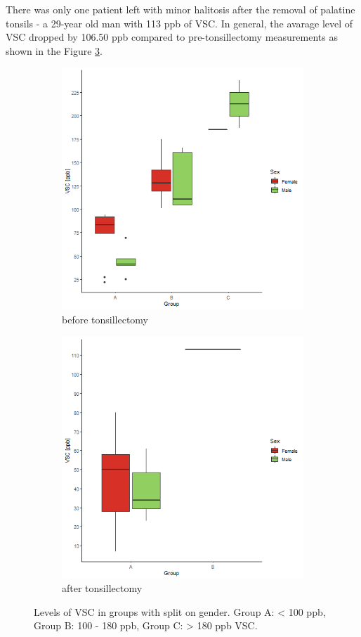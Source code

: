 \documentclass[12pt,a4paper,notitlepage]{report}
\begin{document}
There was only one patient left with minor halitosis after the removal of palatine tonsils - a 29-year old man with 113 ppb of VSC.
In general, the avarage level of VSC dropped by 106.50 ppb compared to pre-tonsillectomy measurements as shown in the Figure \ref{fig:Fig_3.1}.


\begin{figure}[hbt!]
	\centering
	\begin{subfigure}[b]{0.85\textwidth}
		\centering
		\includegraphics[width=.9\textwidth, height=.75\textwidth]{./Figures/Fig_3.1a2} 
		\caption{before tonsillectomy}
		\label{fig:Fig_3.1a}
	\end{subfigure} 
	\vspace*{2cm}
	
	\begin{subfigure}[b]{0.85\textwidth}
		\centering
		\includegraphics[width=.9\textwidth, height=.75\textwidth]{./Figures/Fig_3.1b2}
		\caption{after tonsillectomy}
		\label{fig:Fig_3.1b}
	\end{subfigure}
	 
	\caption{Levels of VSC in groups with split on gender. Group A: < 100 ppb, Group B: 100 - 180 ppb, Group C: > 180 ppb VSC.}
	\label{fig:Fig_3.1}
\end{figure}
\end{document}
